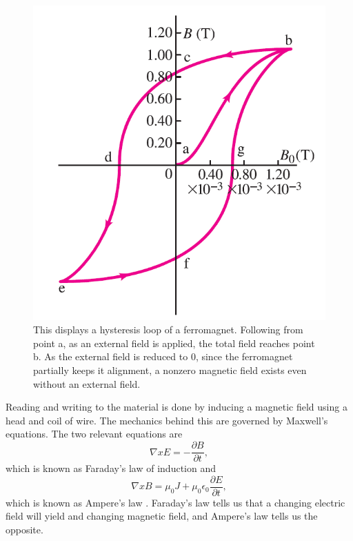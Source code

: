 \documentclass[ notitlepage, numerical, 11pt]{revtex4-1} %
\begin{document}
\begin{figure}[H]
\centerline{\includegraphics[scale=.45]{hysteresis.png}}
\caption{This displays a hysteresis loop of a ferromagnet. Following from point a, as an external field is applied, the total field reaches point b. As the external field is reduced to 0, since the ferromagnet partially keeps it alignment, a nonzero magnetic field exists even without an external field.}
\label{hysteresis}
\end{figure}

Reading and writing to the material is done by inducing a magnetic field using a head and coil of wire. The mechanics behind this are governed by Maxwell's equations. The two relevant equations are
\begin{equation}
\nabla x E = -\frac{\partial B}{\partial t},
\label{faraday}
\end{equation}
which is known as Faraday's law of induction and 
\begin{equation}
\nabla x B = \mu_0 J +\mu_0\epsilon_0\frac{\partial E}{\partial t},
\label{ampere}
\end{equation}
which is known as Ampere's law \cite{purcell}. Faraday's law tells us that a changing electric field will yield and changing magnetic field, and Ampere's law tells us the opposite. 
\end{document}
